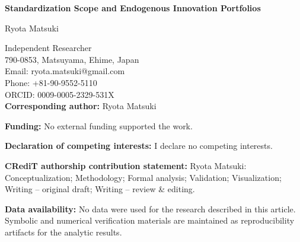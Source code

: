 \documentclass[11pt]{article}
\begin{document}
\begin{center}
{\Large\bfseries Standardization Scope and Endogenous Innovation Portfolios\par}
\vspace{2em}
{\large Ryota Matsuki\par}
\vspace{1em}
Independent Researcher\\
790-0853, Matsuyama, Ehime, Japan\\
Email: ryota.matsuki@gmail.com\\
Phone: +81-90-9552-5110\\
ORCID: 0009-0005-2329-531X\\
\vspace{1em}
\textbf{Corresponding author:} Ryota Matsuki
\end{center}

\vspace{2em}
\noindent\textbf{Funding:} No external funding supported the work.

\vspace{0.75em}
\noindent\textbf{Declaration of competing interests:} I declare no competing interests.

\vspace{0.75em}
\noindent\textbf{CRediT authorship contribution statement:} Ryota Matsuki: Conceptualization; Methodology; Formal analysis; Validation; Visualization; Writing -- original draft; Writing -- review \& editing.

\vspace{0.75em}
\noindent\textbf{Data availability:} No data were used for the research described in this article. Symbolic and numerical verification materials are maintained as reproducibility artifacts for the analytic results.
\end{document}
